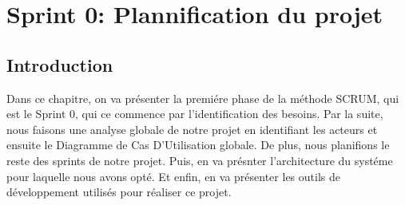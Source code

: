 \chapter{Sprint 0: Plannification du projet}
\localtableofcontents
\section{Introduction}
\noindent
Dans ce chapitre, on va présenter la premiére phase de la méthode SCRUM, qui est le Sprint 0, qui ce commence par l'identification des besoins. Par la suite, nous faisons une analyse globale de notre projet en identifiant les acteurs et ensuite le Diagramme de Cas D'Utilisation globale. De plus, nous planifions le reste des sprints de notre projet. Puis, en va présnter l'architecture du systéme pour laquelle nous avons opté. Et enfin, en va présenter les outils de développement utilisés pour réaliser ce projet.






